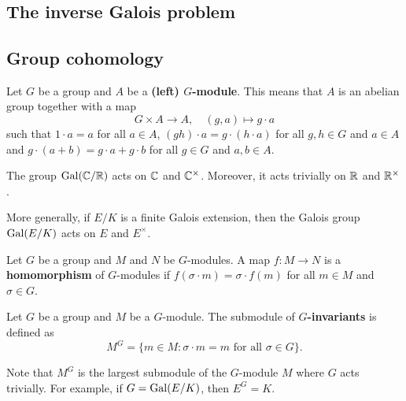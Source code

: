 \section{} 


\subsection{The inverse Galois problem}



\subsection{Group cohomology}

Let $G$ be a group and $A$ be a \textbf{(left) $G$-module}. This means that $A$ is an abelian
group together with a map
\[
G\times A\to A,\quad
(g,a)\mapsto g\cdot a
\]
such that $1\cdot a=a$ for all $a\in A$, $(gh)\cdot a=g\cdot (h\cdot a)$ for 
all $g,h\in G$ and $a\in A$ and $g\cdot (a+b)=g\cdot a+g\cdot b$ for
all $g\in G$ and $a,b\in A$. 

\begin{example}
    The group $\operatorname{Gal}(\mathbb{C}/\mathbb{R})$ acts on $\mathbb{C}$ and $\mathbb{C}^\times$. Moreover, 
    it acts trivially on $\mathbb{R}$ and $\mathbb{R}^\times$. 
\end{example}

More generally, if $E/K$ is a finite Galois extension, then 
the Galois group $\operatorname{Gal}(E/K)$ acts on $E$ and $E^\times$. 

\begin{definition}
    Let $G$ be a group and $M$ and $N$ be $G$-modules. A map 
    $f\colon M\to N$ is a \textbf{homomorphism} of $G$-modules
    if $f(\sigma\cdot m)=\sigma\cdot f(m)$ for all $m\in M$ and $\sigma\in G$.
\end{definition}

\begin{definition}
    Let $G$ be a group and $M$ be a $G$-module.
    The submodule of \textbf{$G$-invariants} is defined as
    \[
    M^G=\{m\in M:\sigma\cdot m=m\text{ for all $\sigma\in G$}\}.
    \]
\end{definition}

Note that $M^G$ is the largest submodule of the $G$-module 
$M$ where $G$ acts trivially. For example, if 
$G=\operatorname{Gal}(E/K)$, then $E^G=K$. 


